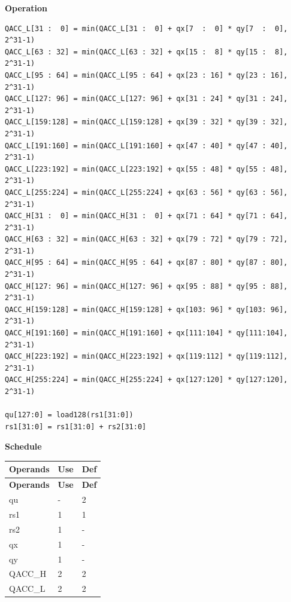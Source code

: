 \textbf{Operation}\\

\begin{lstlisting}
QACC_L[31 :  0] = min(QACC_L[31 :  0] + qx[7  :  0] * qy[7  :  0], 2^31-1)
QACC_L[63 : 32] = min(QACC_L[63 : 32] + qx[15 :  8] * qy[15 :  8], 2^31-1)
QACC_L[95 : 64] = min(QACC_L[95 : 64] + qx[23 : 16] * qy[23 : 16], 2^31-1)
QACC_L[127: 96] = min(QACC_L[127: 96] + qx[31 : 24] * qy[31 : 24], 2^31-1)
QACC_L[159:128] = min(QACC_L[159:128] + qx[39 : 32] * qy[39 : 32], 2^31-1)
QACC_L[191:160] = min(QACC_L[191:160] + qx[47 : 40] * qy[47 : 40], 2^31-1)
QACC_L[223:192] = min(QACC_L[223:192] + qx[55 : 48] * qy[55 : 48], 2^31-1)
QACC_L[255:224] = min(QACC_L[255:224] + qx[63 : 56] * qy[63 : 56], 2^31-1)
QACC_H[31 :  0] = min(QACC_H[31 :  0] + qx[71 : 64] * qy[71 : 64], 2^31-1)
QACC_H[63 : 32] = min(QACC_H[63 : 32] + qx[79 : 72] * qy[79 : 72], 2^31-1)
QACC_H[95 : 64] = min(QACC_H[95 : 64] + qx[87 : 80] * qy[87 : 80], 2^31-1)
QACC_H[127: 96] = min(QACC_H[127: 96] + qx[95 : 88] * qy[95 : 88], 2^31-1)
QACC_H[159:128] = min(QACC_H[159:128] + qx[103: 96] * qy[103: 96], 2^31-1)
QACC_H[191:160] = min(QACC_H[191:160] + qx[111:104] * qy[111:104], 2^31-1)
QACC_H[223:192] = min(QACC_H[223:192] + qx[119:112] * qy[119:112], 2^31-1)
QACC_H[255:224] = min(QACC_H[255:224] + qx[127:120] * qy[127:120], 2^31-1)

qu[127:0] = load128(rs1[31:0])
rs1[31:0] = rs1[31:0] + rs2[31:0]
\end{lstlisting}

\textbf{Schedule}\\
\begin{longtable}[c]{|l|l|l|}
    \hline
    \rowcolor{lightgray}
    \textbf{Operands} & \textbf{Use} & \textbf{Def} \\\hline
    \endfirsthead
    \hline
    \rowcolor{lightgray}
     \textbf{Operands} & \textbf{Use} & \textbf{Def} \\\hline
    \endhead
    \hline
    \endfoot

    qu & - & 2 \\\hline
    rs1 & 1 & 1 \\\hline
    rs2 & 1 & - \\\hline
     qx & 1 & - \\\hline
     qy & 1 & - \\\hline
     QACC\_H & 2 & 2 \\\hline
     QACC\_L & 2 & 2

\end{longtable}

